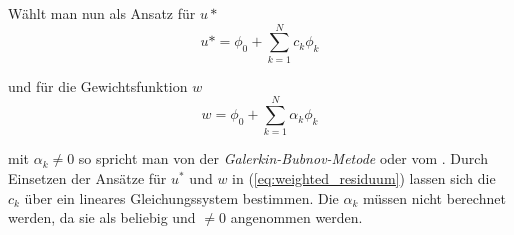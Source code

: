 Wählt man nun als Ansatz für $u*$
\begin{equation}
u* = \phi_0 + \sum_{k = 1}^{N} c_k \phi_k
\end{equation}

und für die Gewichtsfunktion $w$
\begin{equation}
	w = \phi_0 + \sum_{k = 1}^{N} \alpha_k\phi_k
\end{equation}

mit $\alpha_k \neq 0$ so spricht man von der \textit{Galerkin-Bubnov-Metode} oder vom . Durch Einsetzen der Ansätze für $u^*$ und $w$ in (\ref{eq:weighted_residuum}) lassen sich die $c_k$ über ein lineares Gleichungssystem bestimmen. Die $\alpha_k$ müssen nicht berechnet werden, da sie als beliebig und $\neq 0$ angenommen werden. 

